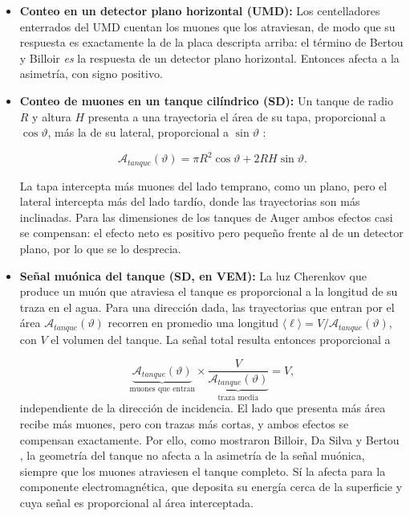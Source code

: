 \begin{itemize}
	\item \textbf{Conteo en un detector plano horizontal (UMD):} Los centelladores enterrados del UMD cuentan los muones que los atraviesan, de modo que su respuesta es exactamente la de la placa descripta arriba: el término de Bertou y Billoir \textit{es} la respuesta de un detector plano horizontal. Entonces afecta a la asimetría, con signo positivo.
	
	\item \textbf{Conteo de muones en un tanque cilíndrico (SD):} Un tanque de radio $R$ y altura $H$ presenta a una trayectoria el área de su tapa, proporcional a $\cos\vartheta$, más la de su lateral, proporcional a $\sin\vartheta$ \cite{Billoir2002b, Armbruster2018}:
	
	\begin{equation}
		\mathcal{A}_{tanque}(\vartheta) = \pi R^2\cos\vartheta + 2RH\sin\vartheta .
		\label{eq:area_tanque}
	\end{equation}
	
	La tapa intercepta más muones del lado temprano, como un plano, pero el lateral intercepta más del lado tardío, donde las trayectorias son más inclinadas. Para las dimensiones de los tanques de Auger ambos efectos casi se compensan: el efecto neto es positivo pero pequeño frente al de un detector plano, por lo que se lo desprecia.
	
	\item \textbf{Señal muónica del tanque (SD, en VEM):} La luz Cherenkov que produce un muón que atraviesa el tanque es proporcional a la longitud de su traza en el agua. Para una dirección dada, las trayectorias que entran por el área $\mathcal{A}_{tanque}(\vartheta)$ recorren en promedio una longitud $\langle\ell\rangle = V/\mathcal{A}_{tanque}(\vartheta)$, con $V$ el volumen del tanque. La señal total resulta entonces proporcional a
	
	\begin{equation}
		\underbrace{\mathcal{A}_{tanque}(\vartheta)}_{\text{muones que entran}} \times \underbrace{\frac{V}{\mathcal{A}_{tanque}(\vartheta)}}_{\text{traza media}} = V ,
		\nonumber
	\end{equation}
	independiente de la dirección de incidencia. El lado que presenta más área recibe más muones, pero con trazas más cortas, y ambos efectos se compensan exactamente. Por ello, como mostraron Billoir, Da Silva y Bertou \cite{Billoir2002b}, la geometría del tanque no afecta a la asimetría de la señal muónica, siempre que los muones atraviesen el tanque completo. Sí la afecta para la componente electromagnética, que deposita su energía cerca de la superficie y cuya señal es proporcional al área interceptada.
\end{itemize}

